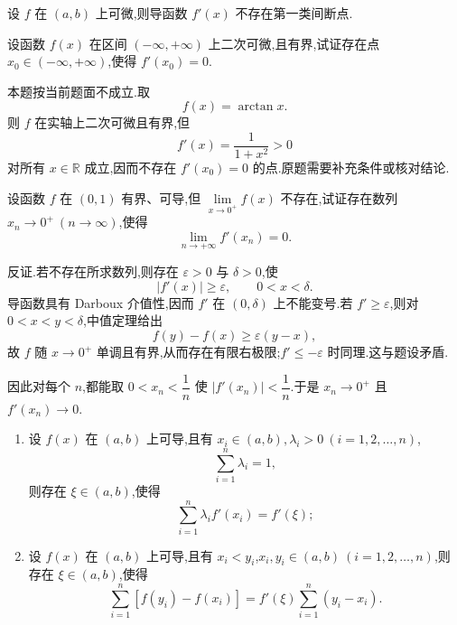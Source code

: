 \begin{corollary}[\markstar]
    设 $f$ 在 $(a,b)$ 上可微,则导函数 $f'(x)$ 不存在第一类间断点.
\end{corollary}

\begin{example}
    设函数 $f(x)$ 在区间 $(-\infty,+\infty)$ 上二次可微,且有界,试证存在点 $x_0\in(-\infty,+\infty)$,使得 $f'(x_0)=0$.
\end{example}
\exampleblank

\begin{solution}
    本题按当前题面不成立.取
    \[
        f(x)=\arctan x.
    \]
    则 $f$ 在实轴上二次可微且有界,但
    \[
        f'(x)=\dfrac{1}{1+x^2}>0
    \]
    对所有 $x\in\mathbb{R}$ 成立,因而不存在 $f'(x_0)=0$ 的点.原题需要补充条件或核对结论.
\end{solution}

\begin{example}
    设函数 $f$ 在 $(0,1)$ 有界、可导,但 $\displaystyle\lim\limits_{x\to0^+}f(x)$ 不存在,试证存在数列 $x_n\to0^+\ (n\to\infty)$,使得
    \[
        \lim\limits_{n\to+\infty}f'(x_n)=0.
    \]
\end{example}
\exampleblank

\begin{solution}
    反证.若不存在所求数列,则存在 $\varepsilon>0$ 与 $\delta>0$,使
    \[
        |f'(x)|\geq\varepsilon,
        \qquad 0<x<\delta.
    \]
    导函数具有 Darboux 介值性,因而 $f'$ 在 $(0,\delta)$ 上不能变号.若 $f'\geq\varepsilon$,则对 $0<x<y<\delta$,中值定理给出
    \[
        f(y)-f(x)\geq\varepsilon(y-x),
    \]
    故 $f$ 随 $x\to0^+$ 单调且有界,从而存在有限右极限;$f'\leq-\varepsilon$ 时同理.这与题设矛盾.

    因此对每个 $n$,都能取 $0<x_n<\dfrac{1}{n}$ 使 $|f'(x_n)|<\dfrac{1}{n}$.于是 $x_n\to0^+$ 且 $f'(x_n)\to0$.
\end{solution}

\begin{example}
    \begin{enumerate}
        \item 设 $f(x)$ 在 $(a,b)$ 上可导,且有 $x_i\in(a,b),\lambda_i>0\ (i=1,2,\ldots,n)$,
              \[
                  \sum\limits_{i=1}^n\lambda_i=1,
              \]
              则存在 $\xi\in(a,b)$,使得
              \[
                  \sum\limits_{i=1}^n\lambda_i f'(x_i)=f'(\xi);
              \]
        \item 设 $f(x)$ 在 $(a,b)$ 上可导,且有 $x_i<y_i$,$x_i,y_i\in(a,b)\ (i=1,2,\ldots,n)$,则存在 $\xi\in(a,b)$,使得
              \[
                  \sum\limits_{i=1}^n[f(y_i)-f(x_i)]
                  =f'(\xi)\sum\limits_{i=1}^n(y_i-x_i).
              \]
    \end{enumerate}
\end{example}
\exampleblank

